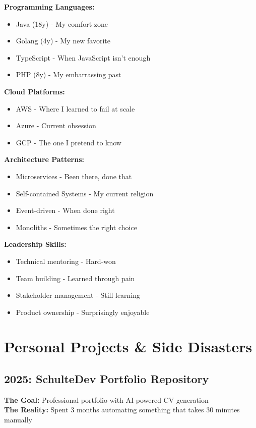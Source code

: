 \documentclass[11pt,a4paper]{article}
\begin{document}
\begin{multicols}{2}
\textbf{Programming Languages:}
\begin{itemize}[leftmargin=1em, itemsep=0.1em]
\item Java (18y) - My comfort zone
\item Golang (4y) - My new favorite
\item TypeScript - When JavaScript isn't enough
\item PHP (8y) - My embarrassing past
\end{itemize}

\textbf{Cloud Platforms:}
\begin{itemize}[leftmargin=1em, itemsep=0.1em]
\item AWS - Where I learned to fail at scale
\item Azure - Current obsession
\item GCP - The one I pretend to know
\end{itemize}

\textbf{Architecture Patterns:}
\begin{itemize}[leftmargin=1em, itemsep=0.1em]
\item Microservices - Been there, done that
\item Self-contained Systems - My current religion
\item Event-driven - When done right
\item Monoliths - Sometimes the right choice
\end{itemize}

\textbf{Leadership Skills:}
\begin{itemize}[leftmargin=1em, itemsep=0.1em]
\item Technical mentoring - Hard-won
\item Team building - Learned through pain
\item Stakeholder management - Still learning
\item Product ownership - Surprisingly enjoyable
\end{itemize}
\end{multicols}

\section{Personal Projects \& Side Disasters}

\subsection{2025: SchulteDev Portfolio Repository}
\textbf{The Goal:} Professional portfolio with AI-powered CV generation\\
\textbf{The Reality:} Spent 3 months automating something that takes 30 minutes manually
\end{document}
